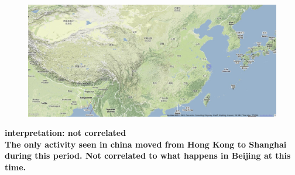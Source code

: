 \documentclass[11pt,a4paper,english]{article}
\begin{document}
\begin{itemize}
\begin{figure}[H]
	  						\begin{center}
								\includegraphics[width=130mm]{img/post-olympic}
							\end{center}
							\vspace{-13pt}
						\end{figure}	
						\bf interpretation: \rm not correlated
						\\ The only activity seen in china moved from Hong Kong to Shanghai during this period. Not correlated to what happens in Beijing at this time.
						
						
				\end{itemize}
			
\end{document}
